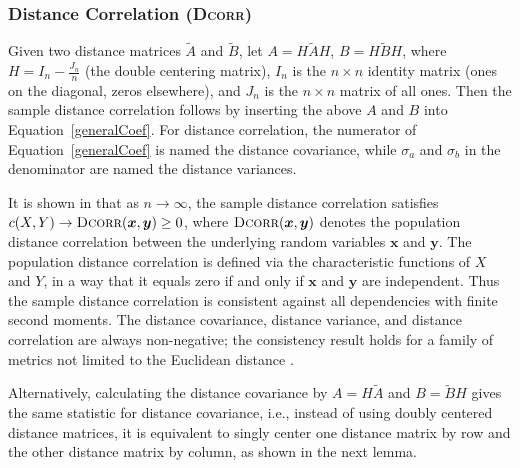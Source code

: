 \documentclass[11pt]{article}
\providecommand{\sct}[1]{{\normalfont\textsc{#1}}}
\providecommand{\mb}[1]{\boldsymbol{#1}}
\newcommand{\GG}{c}
\newcommand{\Dcorr}{\sct{Dcorr}}
\begin{document}
\subsubsection{Distance Correlation (\Dcorr)}
\label{appen:dcorr}
Given two distance matrices $\tilde{A}$ and $\tilde{B}$, let $A=H\tilde{A}H$, $B=H\tilde{B}H$, where $H=I_{n}-\frac{J_{n}}{n}$ (the double centering matrix), $I_n$ is the $n \times n$ identity matrix (ones on the diagonal, zeros elsewhere), and $J_n$ is the $n \times n$ matrix of all ones. Then the sample distance correlation follows by inserting the above $A$ and $B$ into Equation~\ref{generalCoef}. For distance correlation, the numerator of Equation~\ref{generalCoef} is named the distance covariance, while $\sigma_a$ and $\sigma_b$ in the denominator are named the distance variances. %

It is shown in \cite{SzekelyRizzoBakirov2007} that as $n \rightarrow \infty$, the sample distance correlation satisfies $\GG(X,Y) \rightarrow \Dcorr(\mb{x},\mb{y}) \geq 0$, where $\Dcorr(\mb{x},\mb{y})$ denotes the population distance correlation between the underlying random variables $\mb{x}$ and $\mb{y}$. 
The population distance correlation is defined via the characteristic functions of $X$ and $Y$, in a way that it equals zero if and only if $\mb{x}$ and $\mb{y}$ are independent. Thus the sample distance correlation is consistent against all dependencies with finite second moments. The distance covariance, distance variance, and distance correlation are always non-negative; the consistency result holds for a family of metrics not limited to the Euclidean distance \cite{Lyons2013}. %

Alternatively, calculating the distance covariance by $A=H\tilde{A}$ and $B=\tilde{B}H$ gives the same statistic for distance covariance, i.e., instead of using doubly centered distance matrices, it is equivalent to singly center one distance matrix by row and the other distance matrix by column, as shown in the next lemma.
\end{document}
